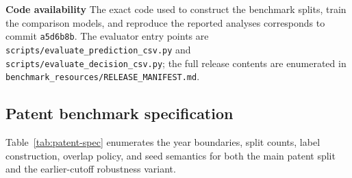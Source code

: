 \documentclass[referee,pdflatex,sn-basic,Numbered]{sn-jnl}
\begin{document}
\textbf{Code availability} The exact code used to construct the benchmark splits, train the comparison models, and reproduce the reported analyses corresponds to commit \texttt{a5d6b8b}. The evaluator entry points are \texttt{scripts/evaluate\_prediction\_csv.py} and \texttt{scripts/evaluate\_decision\_csv.py}; the full release contents are enumerated in \texttt{benchmark\_resources/RELEASE\_MANIFEST.md}.

\clearpage
\begin{appendices}
\setcounter{table}{3}
\renewcommand{\thetable}{\arabic{table}}
\renewcommand{\theHtable}{\arabic{table}}
\setcounter{figure}{2}
\renewcommand{\thefigure}{\arabic{figure}}
\renewcommand{\theHfigure}{\arabic{figure}}

\section{Patent benchmark specification}

Table~\ref{tab:patent-spec} enumerates the year boundaries, split counts, label construction, overlap policy, and seed semantics for both the main patent split and the earlier-cutoff robustness variant.


\end{appendices}
\end{document}
